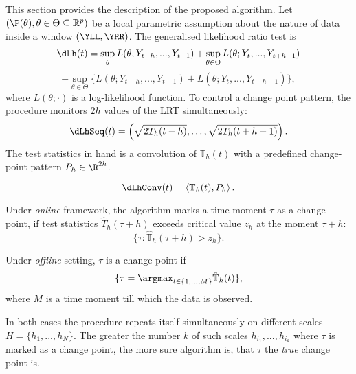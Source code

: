 \label{sec:procedure}
This section provides  the description of the proposed algorithm. Let $(\P(\theta), \theta \in \Theta \subseteq \mathbb{R}^p)$ be a local parametric assumption about the nature of data inside a window $(\YLL, \YRR)$. The generalised likelihood ratio test is 
\[
\dLh(t) = \sup_{\theta}L(\theta, Y_{t-h},..., Y_{t-1}) + \sup_{\theta \in \Theta}L(\theta; Y_{t},...,
Y_{t + h-1})
\]
\[
-\sup_{\theta \in \Theta}\{L(\theta; Y_{t-h},..., Y_{t-1}) + L(\theta; Y_{t},..., Y_{t+h-1})\},
\]
where $L(\theta;\cdot)$ is a log-likelihood function. 
To control a change point pattern, the procedure monitors $2h$ values of the LRT simultaneously:
\[
\dLhSeq(t) = \left(\sqrt{2 T_h(t - h)},\ldots, \sqrt{2 T_h(t + h - 1)}\right).
\]
The test statistics in hand is a convolution of $\mathbb{T}_h(t)$ with a predefined change-point pattern $P_h \in \R^{2h}$.

\[
    \dLhConv(t) = \left<\mathbb{T}_h(t), P_h\right>.
\]

Under \textit{online} framework, the algorithm marks a time moment $\tau$ as a change point,  if test statistics $\hat{T}_{h}(\tau + h)$ exceeds critical value $z_h$ at the moment $\tau + h$:
\[
\{\tau: \hat{\mathbb{T}}_{h}(\tau + h) > z_h\}.
\]

Under \textit{offline} setting, $\tau$ is a change point if
\[
\{\tau = \argmax_{t \in \{1,...,M\}} \hat{\mathbb{T}}_{h}(t)\},
\]
where $M$ is a time moment till which the data is observed.

In both cases the procedure repeats itself simultaneously on different scales $H = \{h_1,..., h_N\}$. The greater the number $k$ of such scales $h_{i_1},...,h_{i_k}$  where $\tau$ is marked as a change point, the more sure algorithm is, that $\tau$ the \textit{true} change point is.


